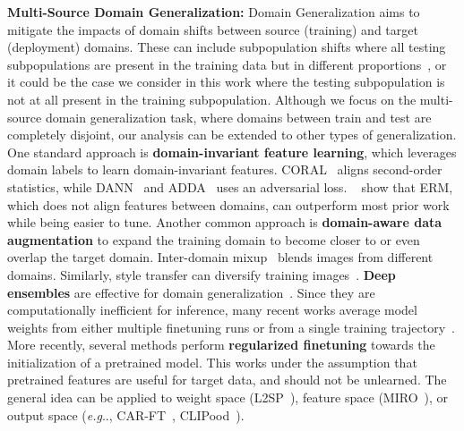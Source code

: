 \documentclass{article} %
\makeatletter
\DeclareRobustCommand\onedot{\futurelet\@let@token\@onedot}
\def\@onedot{\ifx\@let@token.\else.\null\fi\xspace}
\def\eg{\emph{e.g}\onedot} \def\Eg{\emph{E.g}\onedot}
\makeatother
\begin{document}
\textbf{Multi-Source Domain Generalization:} Domain Generalization aims to mitigate the impacts of domain shifts between source (training) and target (deployment) domains. These can include  subpopulation shifts where all testing subpopulations are present in the training data but in different proportions~\citep{dehdashtian2024fairerclip}, or it could be the case we consider in this work where the testing subpopulation is not at all present in the training subpopulation. Although we focus on the multi-source domain generalization task, where domains between train and test are completely disjoint, our analysis can be extended to other types of generalization.  One standard approach is \textbf{domain-invariant feature learning}, which leverages domain labels to learn domain-invariant features. CORAL~\citep{sun2016deep} aligns second-order statistics, while DANN~\citep{ganin2016domain} and ADDA~\citep{tzeng2017adversarial} uses an adversarial loss. ~\citet{gulrajani2020search} show that ERM, which does not align features between domains, can outperform most prior work while being easier to tune. Another common approach is \textbf{domain-aware data augmentation} to expand the training domain to become closer to or even overlap the target domain. Inter-domain mixup~\citep{yan2020improve} blends images from different domains. Similarly, style transfer can diversify training images~\citep{zhong2022adversarial}. \textbf{Deep ensembles} are effective for domain generalization~\citep{arpit2022ensemble}. Since they are computationally inefficient for inference, many recent works average model weights from either multiple finetuning runs or from a single training trajectory~\citep{cha2021swad,arpit2022ensemble,rame2022diwa,jain2023dart,li2023simple,shu2023clipood}. More recently, several methods perform \textbf{regularized finetuning} towards the initialization of a pretrained model. This works under the assumption that pretrained features are useful for target data, and should not be unlearned. The general idea can be applied to weight space (L2SP~\citep{xuhong2018explicit}), feature space (MIRO~\citep{cha2022miro}), or output space (\eg, CAR-FT~\citep{mao2024context}, CLIPood~\citep{shu2023clipood}).  %
\end{document}
